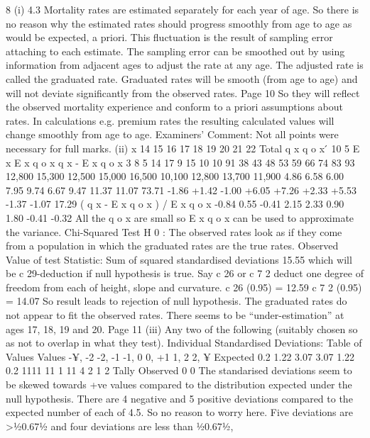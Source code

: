 \documentclass[a4paper,1pt]{article}
\begin{document}
8
(i)
4.3%
Mortality rates are estimated separately for each year of age.
So there is no reason why the estimated rates should progress smoothly
from age to age as would be expected, a priori.
This fluctuation is the result of sampling error attaching to each estimate.
The sampling error can be smoothed out by using information from
adjacent ages to adjust the rate at any age. The adjusted rate is called the
graduated rate.
Graduated rates will be smooth (from age to age) and will not deviate
significantly from the observed rates.
Page 10 %
So they will reflect the observed mortality experience and conform to a
priori assumptions about rates. In calculations e.g. premium rates the
resulting calculated values will change smoothly from age to age.
Examiners’ Comment: Not all points were necessary for full marks.
(ii)
x
14
15
16
17
18
19
20
21
22
Total
q x q o x  ́ 10 5 E x E x q o x q x - E x q o x
3
8
5
14
17
9
15
10
10
91 38
43
48
53
59
66
74
83
93 12,800
15,300
12,500
15,000
16,500
10,100
12,800
13,700
11,900 4.86
6.58
6.00
7.95
9.74
6.67
9.47
11.37
11.07
73.71 -1.86
+1.42
-1.00
+6.05
+7.26
+2.33
+5.53
-1.37
-1.07
17.29
( q x - E x q o x ) / E x q o x
-0.84
0.55
-0.41
2.15
2.33
0.90
1.80
-0.41
-0.32
All the q o x are small so E x q o x can be used to approximate the variance.
Chi-Squared Test
H 0 : The observed rates look as if they come from a population in which the
graduated rates are the true rates.
Observed Value of test Statistic:
Sum of squared standardised deviations 15.55
which will be c 29-deduction if null hypothesis is true.
Say c 26 or c 7 2
deduct one degree of freedom from each of height, slope and curvature.
c 26 (0.95) = 12.59 c 7 2 (0.95) = 14.07
So result leads to rejection of null hypothesis. The graduated rates do not
appear to fit the observed rates.
There seems to be “under-estimation” at ages 17, 18, 19 and 20.
Page 11 %
(iii)
Any two of the following (suitably chosen so as not to overlap in what
they test).
Individual Standardised Deviations:
Table of Values
Values -¥, -2 -2, -1 -1, 0 0, +1 1, 2 2, ¥
Expected 0.2 1.22 3.07 3.07 1.22 0.2
1111 11 1 11
4 2 1 2
Tally
Observed
0
0
The standarised deviations seem to be skewed towards +ve values
compared to the distribution expected under the null hypothesis.
There are 4 negative and 5 positive deviations compared to the expected
number of each of 4.5. So no reason to worry here.
Five deviations are >1⁄20.671⁄2 and four deviations are less than 1⁄20.671⁄2,
\end{document}
